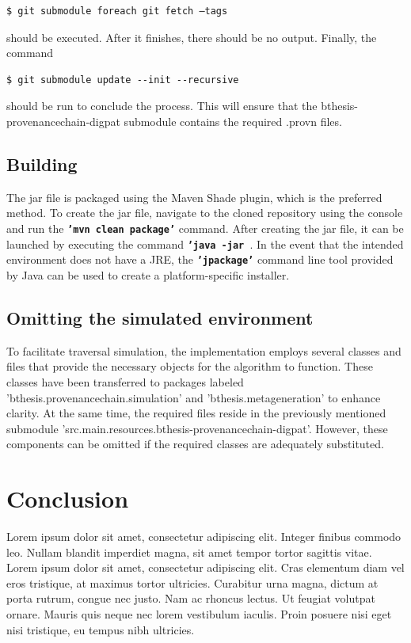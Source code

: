 \documentclass[
  digital,     %
  oneside,     %
  nosansbold,  %
  nocolorbold, %
  lof,         %
  lot,         %
]{fithesis4}
\begin{document}
\begin{verbatim}
$ git submodule foreach git fetch –tags
\end{verbatim}

should be executed. After it finishes, there should be no output. Finally, the command

\begin{verbatim}
$ git submodule update --init --recursive  
\end{verbatim}

should be run to conclude the process. This will ensure that the bthesis-provenancechain-digpat submodule contains the required .provn files.

\section{Building}
The jar file is packaged using the Maven Shade plugin, which is the preferred method. To create the jar file, navigate to the cloned repository using the console and run the \textbf{\texttt{'mvn clean package'}} command. After creating the jar file, it can be launched by executing the command \textbf{\texttt{'java -jar }}. In the event that the intended environment does not have a JRE, the \textbf{\texttt{'jpackage'}} command line tool provided by Java can be used to create a platform-specific installer.

\section{Omitting the simulated environment}
To facilitate traversal simulation, the implementation employs several classes and files that provide the necessary objects for the algorithm to function. These classes have been transferred to packages labeled 'bthesis.provenancechain.simulation' and 'bthesis.metageneration' to enhance clarity. At the same time, the required files reside in the previously mentioned submodule 'src.main.resources.bthesis-provenancechain-digpat'. However, these components can be omitted if the required classes are adequately substituted.
\shorthandon{-}


\chapter*{Conclusion}
\shorthandoff{-}
Lorem ipsum dolor sit amet, consectetur adipiscing elit. Integer finibus commodo leo. Nullam blandit imperdiet magna, sit amet tempor tortor sagittis vitae. Lorem ipsum dolor sit amet, consectetur adipiscing elit. Cras elementum diam vel eros tristique, at maximus tortor ultricies. Curabitur urna magna, dictum at porta rutrum, congue nec justo. Nam ac rhoncus lectus. Ut feugiat volutpat ornare. Mauris quis neque nec lorem vestibulum iaculis. Proin posuere nisi eget nisi tristique, eu tempus nibh ultricies.
\shorthandon{-}
\end{document}
